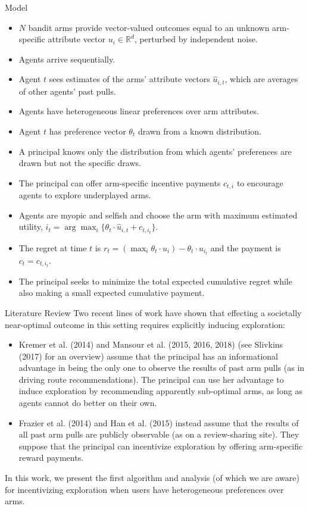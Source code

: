 \documentclass[final]{beamer} %
\begin{document}
\begin{frame}[t]
\begin{columns}[t]
\begin{column}{0.28\paperwidth}
\begin{block}{Model}
\begin{itemize}[label=\textbullet]
\item $N$ bandit arms provide vector-valued outcomes equal to an unknown arm-specific attribute vector $u_{i}\in \mathbb{R}^{d}$, perturbed by independent noise. 
\item Agents arrive sequentially.
\item Agent $t$ sees estimates of the arms’ attribute vectors $\hat{u}_{i,t}$, which are averages of other agents’ past pulls. 
\item Agents have heterogeneous linear preferences over arm attributes.
\item Agent $t$ has preference vector $\theta_t$ drawn from a known distribution.
\item A principal knows only the distribution from which agents’ preferences are drawn but not the specific draws.
\item The principal can offer arm-specific incentive payments $c_{t,i}$ to encourage agents to explore underplayed arms. 
\item Agents are myopic and selfish and choose the arm with maximum estimated utility, $i_t = \arg\max_{i}\{\theta_{t}\cdot \hat{u}_{i,t} + c_{t,i_t}\}$.
\item The regret at time $t$ is $r_t = (\max_{i} \theta_t \cdot u_i) - \theta_t \cdot u_{i_t}$ and the payment is $c_t = c_{t,i_t}$.
\item The principal seeks to minimize the total expected cumulative regret while also making a small expected cumulative payment.
\end{itemize}
\end{block}

\begin{block}{Literature Review}
Two recent lines of work have shown that effecting a societally near-optimal outcome in this setting requires explicitly inducing exploration:
\begin{itemize}[label=\textbullet]
\item Kremer et al. (2014) and Mansour et al. (2015, 2016, 2018) (see Slivkins (2017) for an overview) assume that the principal has an informational advantage in being the only one to observe the results of past arm pulls (as in driving route recommendations). The principal can use her advantage to induce exploration by recommending apparently sub-optimal arms, as long as agents cannot do better on their own.
\item Frazier et al. (2014) and Han et al. (2015) instead assume that the results of all past arm pulls are publicly observable (as on a review-sharing site). They suppose that the principal can incentivize exploration by offering arm-specific reward payments.
\end{itemize}
In this work, we present the first algorithm and analysis (of which we are aware) for incentivizing exploration when users have heterogeneous preferences over arms.\end{block}
\end{column}


\end{columns}
\end{frame}
\end{document}
